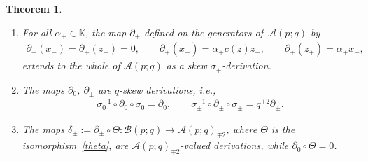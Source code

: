 \documentclass[10pt,a4paper]{amsart}
\numberwithin{equation}{section}
\newtheorem{Theorem}{Theorem}[section]
\def\Weyl#1#2{{\mathcal{B}}(#1;#2)}
\def\AWeyl#1#2{{\mathcal{A}}(#1;#2)}
\begin{document}
\begin{Theorem}
\begin{enumerate}
extends to the whole of $\AWeyl p q$ as a skew $\sigma_-$-derivation.
\item[$(4)$] For all $\alpha_+ \in {\mathbb K}$, the map $\partial_+$ defined on the generators of~$\AWeyl p q$ by
\begin{gather*}%
\partial_+(x_-)=\partial_+(z_-) = 0, \qquad \partial_+(x_+) = \alpha_+ c(z) z_-,\qquad \partial_+(z_+) = \alpha_+ x_-,
\end{gather*}
extends to the whole of $\AWeyl p q$ as a skew $\sigma_+$-derivation.
\item[$(5)$] The maps $\partial_0$, $\partial_{\pm}$ are $q$-skew derivations, i.e.,
\begin{gather}\label{q}
\sigma_0^{-1}\circ \partial_0 \circ \sigma_0 = \partial_0, \qquad \sigma_\pm^{-1}\circ \partial_\pm \circ \sigma_\pm = q^{\pm 2} \partial_\pm.
\end{gather}
\item[$(6)$] The maps $\delta_\pm := \partial_\pm\circ \Theta\colon \Weyl p q \to \AWeyl p q_ {\mp 2}$, where $\Theta$ is the isomorphism~\eqref{theta}, are $\AWeyl p q_{\mp 2}$-valued derivations, while $\partial_0\circ \Theta =0$.
\end{enumerate}
\end{Theorem}
\end{document}
